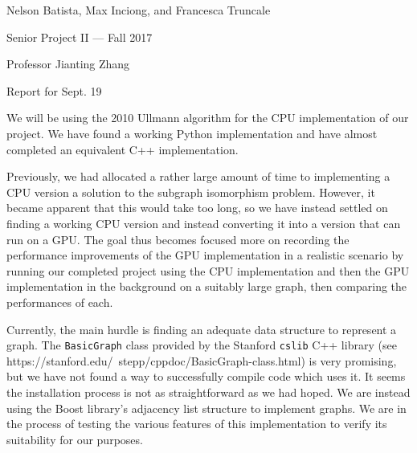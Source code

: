 \documentclass{article}
\begin{document}
\noindent Nelson Batista, Max Inciong, and Francesca Truncale

\noindent Senior Project II --- Fall 2017

\noindent Professor Jianting Zhang

\noindent Report for Sept. 19

We will be using the 2010 Ullmann algorithm for the CPU implementation of our project. We have found a working Python implementation and have almost completed an equivalent C++ implementation. 

Previously, we had allocated a rather large amount of time to implementing a CPU version a solution to the subgraph isomorphism problem. However, it became apparent that this would take too long, so we have instead settled on finding a working CPU version and instead converting it into a version that can run on a GPU\@. The goal thus becomes focused more on recording the performance improvements of the GPU implementation in a realistic scenario by running our completed project using the CPU implementation and then the GPU implementation in the background on a suitably large graph, then comparing the performances of each.

Currently, the main hurdle is finding an adequate data structure to represent a graph. The \texttt{BasicGraph} class provided by the Stanford \texttt{cslib} C++ library (see https://stanford.edu/~stepp/cppdoc/BasicGraph-class.html) is very promising, but we have not found a way to successfully compile code which uses it. It seems the installation process is not as straightforward as we had hoped. We are instead using the Boost library's adjacency list structure to implement graphs. We are in the process of testing the various features of this implementation to verify its suitability for our purposes.
\end{document}
